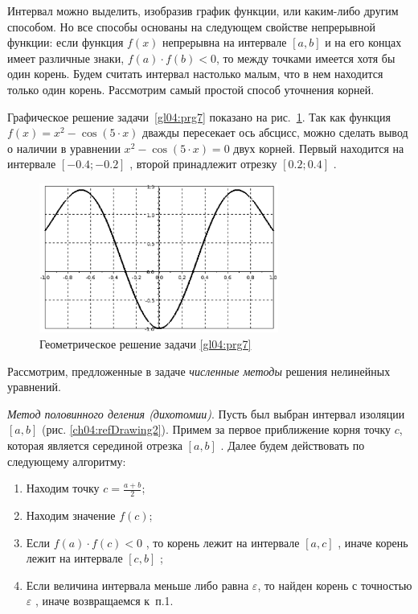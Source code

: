 Интервал можно выделить, изобразив график функции, или каким-либо другим способом. Но все способы основаны на следующем
свойстве непрерывной функции: если функция  $f(x)$  непрерывна на интервале  $[a,b]$ и на его концах имеет различные
знаки,  $f(a)\cdot f(b)<0$, то между точками имеется хотя бы один корень. Будем считать интервал настолько малым, что в
нем находится только один корень. Рассмотрим самый простой способ уточнения корней.

Графическое решение задачи~\ref{gl04:prg7} показано на рис.~\ref{ch04:refDrawing1}. 
Так как функция  $f(x)=x^2-\cos (5\cdot x)$
 дважды пересекает ось абсцисс, можно сделать вывод о наличии  в уравнении  $x^2-\cos (5\cdot x)=0$  двух корней.
Первый находится на интервале  $[-0.4;-0.2]$ , второй принадлежит отрезку  $[0.2;0.4]$ .

\begin{figure}[htb]
\begin{center}
\includegraphics[width=0.7\textwidth]{img/ris_4_2}
\caption{Геометрическое решение задачи \ref{gl04:prg7}}
\label{ch04:refDrawing1}
\end{center}
\end{figure}

Рассмотрим, предложенные в задаче \emph{численные методы }решения нелинейных уравнений.

\emph{Метод половинного деления (дихотомии)}. Пусть был выбран интервал изоляции  $[a,b]$  (рис.
\ref{ch04:refDrawing2}). Примем за первое приближение корня точку $c$, которая является серединой отрезка 
$[a,b]$ . Далее будем действовать по следующему алгоритму:
\begin{enumerate}
\item Находим точку  $c=\frac{a+b}{2}$;
\item Находим значение  $f(c)$;
\item Если  $f(a)\cdot f(c)<0$ , то корень лежит на интервале  $[a,c]$ , иначе корень лежит на интервале  $[c,b]$ ;
\item Если величина интервала меньше либо равна  $\varepsilon$, то найден корень с точностью  $\varepsilon$ , иначе
возвращаемся к~п.1.
\end{enumerate}

